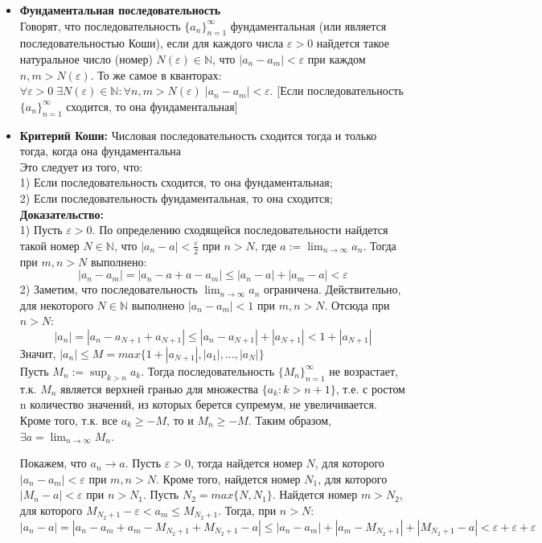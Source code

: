 \documentclass[12pt,a4paper]{article}
\begin{document}
\begin{itemize}

\item \textbf{Фундаментальная последовательность} \\
Говорят, что последовательность $\{a_n\}_{n=1}^{\infty}$ фундаментальная (или является последовательностью Коши), если для каждого числа $\varepsilon > 0$ найдется такое натуральное число (номер) $N(\varepsilon) \in \mathbb{N}$, что $|a_n - a_m| < \varepsilon$ при каждом $n, m > N(\varepsilon)$. То же самое в кванторах: $\forall \varepsilon > 0 \; \exists N(\varepsilon) \in \mathbb{N}: \forall n, m > N(\varepsilon) \; |a_n - a_m| < \varepsilon$.
[Если последовательность $\{a_n\}_{n=1}^{\infty}$ сходится, то она фундаментальная]

\item \textbf{Критерий Коши: }Числовая последовательность сходится тогда и только тогда, когда она фундаментальна \\
Это следует из того, что: \\
1) Если последовательность сходится, то она фундаментальная; \\
2) Если последовательность фундаментальная, то она сходится; \\
\textbf{Доказательство:} \\
1) Пусть $\varepsilon > 0$. По определению сходящейся последовательности найдется такой номер $N \in \mathbb{N}$, что $|a_n - a| < \frac{\varepsilon}{2}$ при $n > N$, где $a := \lim_{n \to \infty}{a_n}$. Тогда при $m, n > N$ выполнено:
\[
|a_n - a_m| = |a_n - a + a - a_m| \leq |a_n - a| + |a_m - a| < \varepsilon
\]
2) Заметим, что последовательность $\lim_{n \to \infty}{a_n}$ ограничена. Действительно, для некоторого $N \in \mathbb{N}$ выполнено $|a_n - a_m| < 1$ при $m, n > N$. Отсюда при $n > N$:
\[
|a_n| = |a_n - a_{N+1} + a_{N+1}| \leq |a_n - a_{N+1}| + |a_{N+1}| < 1 + |a_{N+1}|
\]
Значит, $|a_n| \leq M = max\{1 + |a_{N+1}|,|a_1|, ..., |a_N|\}$ \\
Пусть $M_n := \sup_{k > n}{a_k}$. Тогда последовательность $\{M_n\}_{n=1}^{\infty}$ не возрастает, т.к. $M_n$ является верхней гранью для множества $\{a_k: k > n+1\}$, т.е. с ростом n количество значений, из которых берется супремум, не увеличивается. Кроме того, т.к. все $a_k \geq -M$, то и $M_n \geq -M$. Таким образом, $\exists a = \lim_{n \to \infty}{M_n}$. 

Покажем, что $a_n \longrightarrow a$. Пусть $\varepsilon > 0$, тогда найдется номер $N$, для которого $|a_n - a_m| < \varepsilon$ при $m, n > N$. Кроме того, найдется номер $N_1$, для которого $|M_n - a| < \varepsilon$ при $n > N_1$. Пусть $N_2 = max\{N, N_1\}$. Найдется номер $m > N_2$, для которого $M_{N_2+1} - \varepsilon < a_m \leq M_{N_2+1}$. Тогда, при $n > N$: \\
$|a_n - a| = |a_n - a_m + a_m - M_{N_2+1} + M_{N_2+1} - a| \leq |a_n - a_m| + |a_m - M_{N_2+1}| + |M_{N_2+1} - a| < \varepsilon + \varepsilon + \varepsilon$


\end{itemize}
\end{document}
